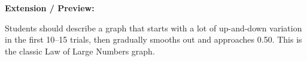 \documentclass[10pt]{article}
\begin{document}
\begin{practicebox}
\vspace{6pt}
\textbf{Extension / Preview:}
\begin{teachernote}
Students should describe a graph that starts with a lot of up-and-down variation in the first 10--15 trials, then gradually smooths out and approaches 0.50. This is the classic Law of Large Numbers graph.
\end{teachernote}

\end{practicebox}
\end{document}
